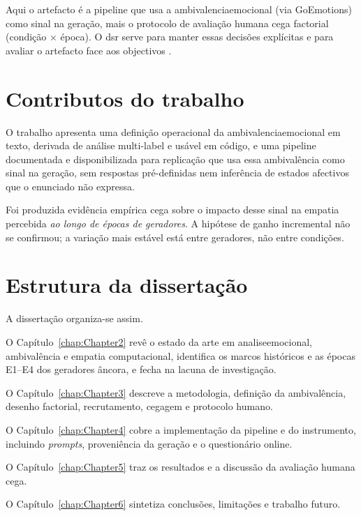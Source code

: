 Aqui o artefacto é a \gls{pipeline} que usa a \gls{ambivalenciaemocional} (via GoEmotions) como sinal na geração, mais o protocolo de avaliação humana cega factorial (condição \(\times\) época). O \gls{dsr} serve para manter essas decisões explícitas e para avaliar o artefacto face aos objectivos \parencite{Peffers2007Design}.


\section{Contributos do trabalho}
\label{sec:contributos}

O trabalho apresenta uma definição operacional da \gls{ambivalenciaemocional} em texto, derivada de análise multi-label e usável em código, e uma \gls{pipeline} documentada e disponibilizada para replicação que usa essa ambivalência como sinal na geração, sem respostas pré-definidas nem inferência de estados afectivos que o enunciado não expressa.

Foi produzida evidência empírica cega sobre o impacto desse sinal na empatia percebida \textit{ao longo de épocas de geradores}. A hipótese de ganho incremental não se confirmou; a variação mais estável está entre geradores, não entre condições.


\section{Estrutura da dissertação}
\label{sec:estrutura}

A dissertação organiza-se assim.

O Capítulo~\ref{chap:Chapter2} revê o estado da arte em \gls{analiseemocional}, ambivalência e empatia computacional, identifica os marcos históricos e as épocas E1--E4 dos geradores âncora, e fecha na lacuna de investigação.

O Capítulo~\ref{chap:Chapter3} descreve a metodologia, definição da ambivalência, desenho factorial, recrutamento, cegagem e protocolo humano.

O Capítulo~\ref{chap:Chapter4} cobre a implementação da pipeline e do instrumento, incluindo \textit{prompts}, proveniência da geração e o questionário online.

O Capítulo~\ref{chap:Chapter5} traz os resultados e a discussão da avaliação humana cega.

O Capítulo~\ref{chap:Chapter6} sintetiza conclusões, limitações e trabalho futuro.


